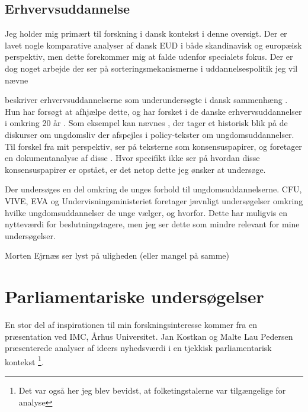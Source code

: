 \subsection{Erhvervsuddannelse}
Jeg holder mig primært til forskning i dansk kontekst i denne oversigt.
Der er lavet nogle komparative analyser af dansk EUD i både skandinavisk og europæisk perspektiv, men dette forekommer mig at falde udenfor specialets fokus.
Der er dog noget arbejde der ser på sorteringsmekanismerne i uddannelsespolitik jeg vil nævne


\citeauthor{juulErhvervsuddannelserneForsomtForskningsomrade2004} beskriver erhvervsuddannelserne som underundersøgte i dansk sammenhæng \autocite{juulErhvervsuddannelserneForsomtForskningsomrade2004}.
Hun har forsøgt at afhjælpe dette, og har forsket i de danske erhvervsuddannelser i omkring 20 år \autocite{IdaJuulPublikationer}.
Som eksempel kan nævnes , der tager et historisk blik på de diskurser om ungdomsliv der afspejles i policy-tekster om ungdomsuddannelser.
Til forskel fra mit perspektiv, ser \citeauthor{juulDiskurserOmUngdom2013} på teksterne som konsensuspapirer, og foretager en dokumentanalyse af disse \autocite{juulDiskurserOmUngdom2013}.
Hvor \citeauthor{juulDiskurserOmUngdom2013} specifikt ikke ser på hvordan disse konsensuspapirer er opstået, er det netop dette jeg ønsker at undersøge.

Der undersøges en del omkring de unges forhold til ungdomsuddannelserne. CFU, VIVE, EVA og Undervisningsministeriet foretager jævnligt undersøgelser omkring hvilke ungdomsuddannelser de unge vælger, og hvorfor.
Dette har muligvis en nytteværdi for beslutningstagere, men jeg ser dette som mindre relevant for mine undersøgelser.

Morten Ejrnæs ser lyst på uligheden (eller mangel på samme)

\section{Parliamentariske undersøgelser}\label{sec:review-parl}

En stor del af inspirationen til min forskningsinteresse kommer fra en præsentation ved IMC, Århus Universitet. Jan Kostkan og Malte Lau Pedersen præsenterede analyser af ideers nyhedsværdi i en tjekkisk parliamentarisk kontekst \footnote{Det var også her jeg blev bevidst, at folketingstalerne var tilgængelige for analyse}.

